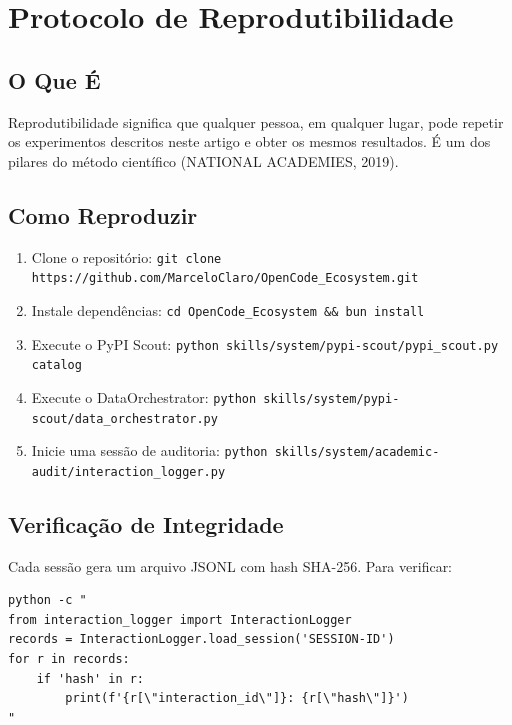 \documentclass[12pt,a4paper]{article}
\begin{document}
\section{Protocolo de Reprodutibilidade}

\subsection{O Que É}

Reprodutibilidade significa que qualquer pessoa, em qualquer lugar, pode repetir os experimentos descritos neste artigo e obter os mesmos resultados. É um dos pilares do método científico (NATIONAL ACADEMIES, 2019).

\subsection{Como Reproduzir}

\begin{enumerate}[itemsep=2pt]
  \item Clone o repositório: \texttt{git clone https://github.com/MarceloClaro/OpenCode\_Ecosystem.git}
  \item Instale dependências: \texttt{cd OpenCode\_Ecosystem \&\& bun install}
  \item Execute o PyPI Scout: \texttt{python skills/system/pypi-scout/pypi\_scout.py catalog}
  \item Execute o DataOrchestrator: \texttt{python skills/system/pypi-scout/data\_orchestrator.py}
  \item Inicie uma sessão de auditoria: \texttt{python skills/system/academic-audit/interaction\_logger.py}
\end{enumerate}

\subsection{Verificação de Integridade}

Cada sessão gera um arquivo JSONL com hash SHA-256. Para verificar:

\begin{verbatim}
python -c "
from interaction_logger import InteractionLogger
records = InteractionLogger.load_session('SESSION-ID')
for r in records:
    if 'hash' in r:
        print(f'{r[\"interaction_id\"]}: {r[\"hash\"]}')
"
\end{verbatim}
\end{document}
